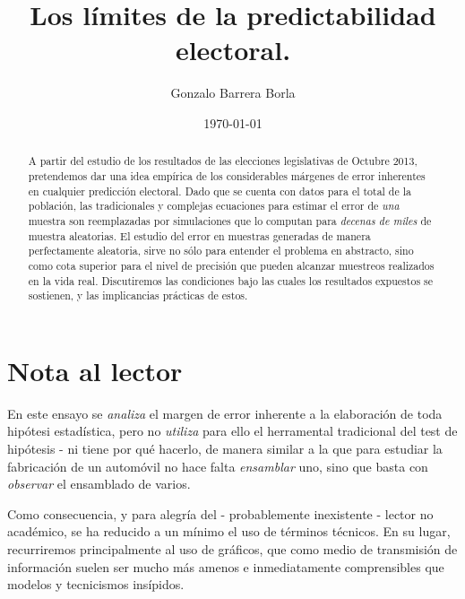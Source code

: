 \documentclass[12pt, a4paper]{article}
\begin{document}
\title{Los l\'imites de la predictabilidad electoral.}
\author{Gonzalo Barrera Borla}
\date{\today}

\maketitle

\pagebreak

\begin{abstract}
	A partir del estudio de los resultados de las elecciones legislativas de Octubre 2013, pretendemos dar una idea emp\'irica de los considerables m\'argenes de error inherentes en cualquier predicci\'on electoral. Dado que se cuenta con datos para el total de la poblaci\'on, las tradicionales y complejas ecuaciones para estimar el error de \emph{una} muestra son reemplazadas por simulaciones que lo computan para \emph{decenas de miles} de muestra aleatorias.
	El estudio del error en muestras generadas de manera perfectamente aleatoria, sirve no s\'olo para entender el problema en abstracto, sino como cota superior para el nivel de precisi\'on que pueden alcanzar muestreos realizados en la vida real. Discutiremos las condiciones bajo las cuales los resultados expuestos se sostienen, y las implicancias pr\'acticas de estos.
\end{abstract}

\pagebreak

\tableofcontents

\pagebreak

\section{Nota al lector}

En este ensayo se \emph{analiza} el margen de error inherente a la elaboraci\'on de toda hip\'otesi estad\'istica, pero no \emph{utiliza} para ello el herramental tradicional del test de hip\'otesis - ni tiene por qu\'e hacerlo, de manera similar a la que para estudiar la fabricaci\'on de un autom\'ovil no hace falta \emph{ensamblar} uno, sino que basta con \emph{observar} el ensamblado de varios.

Como consecuencia, y para alegr\'ia del - probablemente inexistente - lector no acad\'emico, se ha reducido a un m\'inimo el uso de t\'erminos t\'ecnicos. En su lugar, recurriremos principalmente al uso de gr\'aficos, que como medio de transmisi\'on de informaci\'on suelen ser mucho m\'as amenos e inmediatamente comprensibles que modelos y tecnicismos ins\'ipidos.
\end{document}
